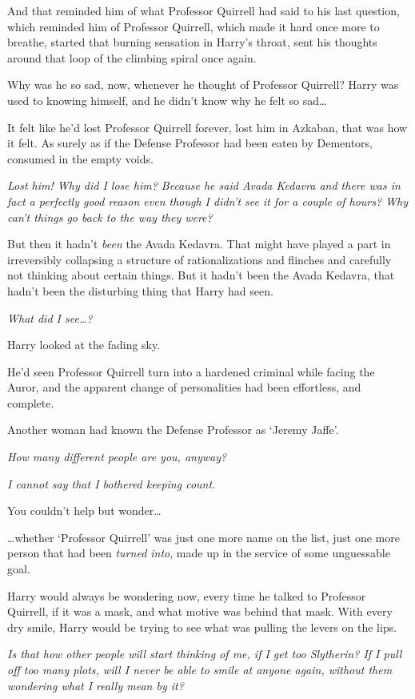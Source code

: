 And that reminded him of what Professor Quirrell had said to his last question, 
which reminded him of Professor Quirrell, which made it hard once more to 
breathe, started that burning sensation in Harry's throat, sent his thoughts 
around that loop of the climbing spiral once again.

Why was he so sad, now, whenever he thought of Professor Quirrell? Harry was 
used to knowing himself, and he didn't know why he felt so sad{\ldots}

It felt like he'd lost Professor Quirrell forever, lost him in Azkaban, that 
was how it felt. As surely as if the Defense Professor had been eaten by 
Dementors, consumed in the empty voids.

\emph{Lost him! Why did I lose him? Because he said Avada Kedavra and there was 
in fact a perfectly good reason even though I didn't see it for a couple of 
hours? Why can't things go back to the way they were?}

But then it hadn't \emph{been} the Avada Kedavra. That might have played a part 
in irreversibly collapsing a structure of rationalizations and flinches and 
carefully not thinking about certain things. But it hadn't been the Avada 
Kedavra, that hadn't been the disturbing thing that Harry had seen.

\emph{What did I see{\ldots}?}

Harry looked at the fading sky.

He'd seen Professor Quirrell turn into a hardened criminal while facing the 
Auror, and the apparent change of personalities had been effortless, and 
complete.

Another woman had known the Defense Professor as `Jeremy Jaffe'.

\emph{How many different people are you, anyway?}

\emph{I cannot say that I bothered keeping count.}

You couldn't help but wonder{\ldots}

{\ldots}whether `Professor Quirrell' was just one more name on the list, just 
one more person that had been \emph{turned into}, made up in the service of 
some unguessable goal.

Harry would always be wondering now, every time he talked to Professor 
Quirrell, if it was a mask, and what motive was behind that mask. With every 
dry smile, Harry would be trying to see what was pulling the levers on the lips.

\emph{Is that how other people will start thinking of me, if I get too 
Slytherin? If I pull off too many plots, will I never be able to smile at 
anyone again, without them wondering what I really mean by it?}

